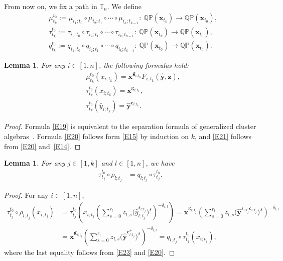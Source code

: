 \documentclass[10pt,a4paper]{amsart}
\numberwithin{equation}{section}
\newtheorem{Lemma}[Theorem]{Lemma}
\begin{document}
From now on, we fix a path
 in $\mathbb{T}_n$. We define
\begin{align*}
 &\mu_{t_k}^{t_0}:=\mu_{i_1;t_0}\circ \mu_{i_2;t_1}\circ\cdots\circ \mu_{i_k;t_{k-1}}\colon\ \mathbb{QP}(\mathbf{x}_{t_k})\to \mathbb{QP}(\mathbf{x}_{t_0}),\\
 &\tau_{t_k}^{t_0}:=\tau_{i_1;t_0}\circ\tau_{i_2;t_1}\circ\cdots\circ \tau_{i_k;t_{k-1}}\colon\  \mathbb{QP}(\mathbf{x}_{t_k})\to \mathbb{QP}(\mathbf{x}_{t_0}),\\
 &q_{t_k}^{t_0}:=q_{i_1;t_0}\circ q_{i_2;t_1}\circ\cdots\circ q_{i_k;t_{k-1}}\colon\   \mathbb{QP}(\mathbf{x}_{t_0})\to \mathbb{QP}(\mathbf{x}_{t_0}).
\end{align*}

\begin{Lemma}\label{L9}
For any $i\in [1,n]$, the following formulas hold:
\begin{align}
& \mu_{t_k}^{t_0}(x_{i;t_k})=\mathbf{x}^{\mathbf{g}_{i;t_k}}F_{i;t_k}(\mathbf{\hat{y}},\mathbf{z}),\label{E19}\\
 &\tau_{t_k}^{t_0}(x_{i;t_k})=\mathbf{x}^{\mathbf{g}_{i;t_k}},\label{E20}\\
 &\tau_{t_k}^{t_0}(\hat{y}_{i;t_k})=\mathbf{\hat{y}}^{\mathbf{c}_{i;t_k}}\label{E21}.
\end{align}
\end{Lemma}
\begin{proof}
Formula \eqref{E19} is equivalent to the separation formula of generalized cluster alge\-bras~\cite{Nakanishi14}. Formula \eqref{E20} follows form \eqref{E15} by induction on $k$, and \eqref{E21} follows from \eqref{E20} and~\eqref{E14}.
\end{proof}

\begin{Lemma}
 For any $j\in [1,k]$ and $l\in [1,n]$, we have
 \begin{align}
 \tau_{t_j}^{t_0}\circ\rho_{l;t_j}&=q_{l;t_j}\circ\tau_{t_j}^{t_0}.\label{E24}
\end{align}
\end{Lemma}
\begin{proof}
For any $i\in [1,n]$,
\begin{align*}
 \tau_{t_j}^{t_0}\circ\rho_{l;t_j}(x_{i;t_j})
 &=\tau_{t_j}^{t_0}\left(x_{i;t_j}\left(\sum\limits_{s=0}^{r_{l}}z_{l,s}\bigl(\hat{y}^{\varepsilon_{l;t_j}}_{l;t_j}\bigr)^s\right)^{-\delta_{i,l}}\right)
 =\mathbf{x}^{\mathbf{g}_{i;t_j}}\left(\sum\limits_{s=0}^{r_{l}}z_{l,s}\bigl(\mathbf{\hat{y}}^{\varepsilon_{l;t_j}\mathbf{c}_{l;t_j}}\bigr)^s\right)^{-\delta_{i,l}}\\
 &=\mathbf{x}^{\mathbf{g}_{i;t_j}}\left(\sum\limits_{s=0}^{r_{l}}z_{l,s}\bigl(\mathbf{\hat{y}}^{\mathbf{c}_{l;t_j}^+}\bigr)^s\right)^{-\delta_{i,l}}
 =q_{l;t_j}\circ\tau_{t_j}^{t_0}(x_{i;t_j}),
 \end{align*}
 where the last equality follows from \eqref{E23} and \eqref{E20}.
\end{proof}
\end{document}
